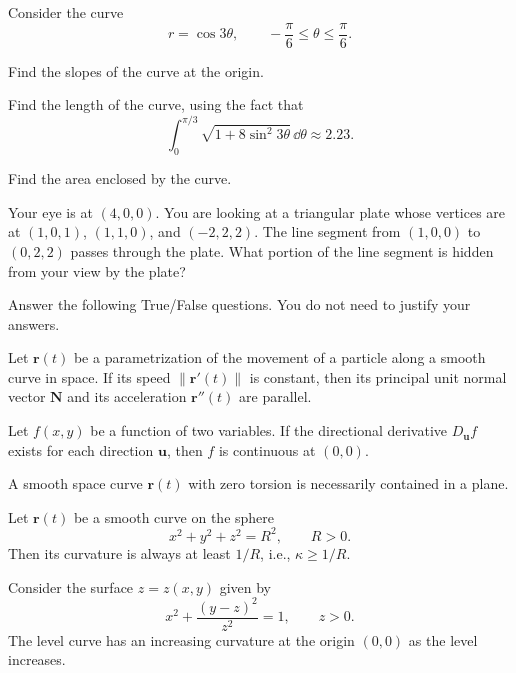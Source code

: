 \begin{problem}
Consider the curve
\[
r=\cos3\theta,
\qquad -\frac{\pi}{6}\le\theta\le\frac{\pi}{6}.
\]
\begin{problemsubparts}
\item Find the slopes of the curve at the origin.
\item Find the length of the curve, using the fact that
\[
\int_0^{\pi/3}\sqrt{1+8\sin^2 3\theta}\,\dd\theta\approx2.23.
\]
\item Find the area enclosed by the curve.
\end{problemsubparts}
\end{problem}

\begin{problem}
Your eye is at $(4, 0, 0)$. You are looking at a triangular plate whose vertices are at $(1, 0, 1)$, $(1, 1, 0)$, and $(-2, 2, 2)$. The line segment from $(1, 0, 0)$ to $(0, 2, 2)$ passes through the plate. What portion of the line segment is hidden from your view by the plate?
\end{problem}

\begin{problem}
Answer the following True/False questions. You do not need to justify your answers.
\begin{problemsubparts}
\item Let $\mathbf r(t)$ be a parametrization of the movement of a particle along a smooth curve in space. If its speed $\|\mathbf r'(t)\|$ is constant, then its principal unit normal vector $\mathbf N$ and its acceleration $\mathbf r''(t)$ are parallel.
\item Let $f(x, y)$ be a function of two variables. If the directional derivative $D_{\mathbf u}f$ exists for each direction $\mathbf u$, then $f$ is continuous at $(0, 0)$.
\item A smooth space curve $\mathbf r(t)$ with zero torsion is necessarily contained in a plane.
\item Let $\mathbf r(t)$ be a smooth curve on the sphere
\[
x^2+y^2+z^2=R^2,
\qquad R>0.
\]
Then its curvature is always at least $1/R$, i.e., $\kappa\ge 1/R$.
\item Consider the surface $z=z(x, y)$ given by
\[
x^2+\frac{(y-z)^2}{z^2}=1,
\qquad z>0.
\]
The level curve has an increasing curvature at the origin $(0, 0)$ as the level increases.
\end{problemsubparts}
\end{problem}

